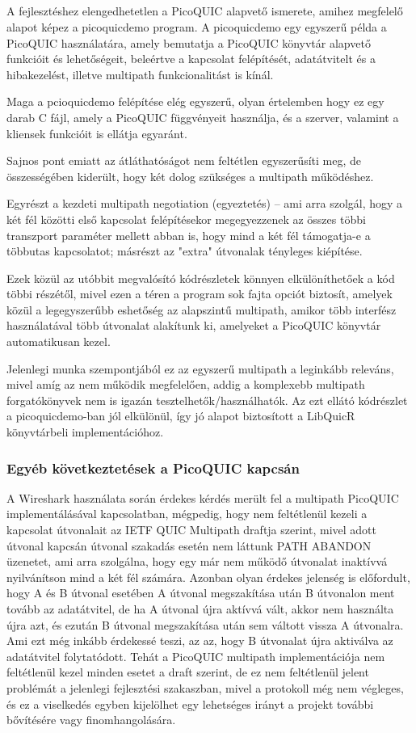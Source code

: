 \documentclass[a4paper,oneside]{article}
\begin{document}
\subparagraph{}
A fejlesztéshez elengedhetetlen a PicoQUIC alapvető ismerete, amihez megfelelő alapot képez a picoquicdemo program.
A picoquicdemo egy egyszerű példa a PicoQUIC használatára, amely bemutatja a
PicoQUIC könyvtár alapvető funkcióit és lehetőségeit, beleértve a kapcsolat
felépítését, adatátvitelt és a hibakezelést, illetve multipath funkcionalitást is kínál. 

Maga a pcioquicdemo felépítése elég egyszerű, olyan értelemben hogy ez egy darab C fájl, amely a PicoQUIC függvényeit használja, 
és a szerver, valamint a kliensek funkcióit is ellátja egyaránt. 

Sajnos pont emiatt az átláthatóságot nem feltétlen egyszerűsíti meg, de összességében kiderült, hogy két dolog szükséges a multipath működéshez.

Egyrészt a kezdeti multipath negotiation (egyeztetés) – ami arra szolgál, hogy a két fél közötti első
kapcsolat felépítésekor megegyezzenek az összes többi transzport paraméter mellett abban is, 
hogy mind a két fél támogatja-e a többutas kapcsolatot; másrészt az "extra" útvonalak tényleges kiépítése.

Ezek közül az utóbbit megvalósító kódrészletek könnyen elkülöníthetőek a kód többi részétől, mivel ezen a 
téren a program sok fajta opciót biztosít, amelyek közül a legegyszerűbb eshetőség az alapszintű 
multipath, amikor több interfész használatával több útvonalat alakítunk ki, amelyeket a PicoQUIC könyvtár automatikusan kezel.

Jelenlegi munka szempontjából ez az egyszerű multipath a leginkább releváns,
mivel amíg az nem működik megfelelően, addig a komplexebb multipath forgatókönyvek nem is igazán tesztelhetők/használhatók.
Az ezt ellátó kódrészlet a picoquicdemo-ban jól elkülönül, így jó alapot biztosított a LibQuicR könyvtárbeli implementációhoz.

\subsubsection{Egyéb következtetések a PicoQUIC kapcsán}

A Wireshark használata során érdekes kérdés merült fel a multipath PicoQUIC implementálásával kapcsolatban,
mégpedig, hogy nem feltétlenül kezeli a kapcsolat útvonalait az IETF QUIC Multipath draftja szerint, mivel adott útvonal kapcsán útvonal szakadás 
esetén nem láttunk PATH ABANDON üzenetet, ami arra szolgálna, hogy egy már nem működő útvonalat inaktívvá nyilvánítson mind a két fél számára.
Azonban olyan érdekes jelenség is előfordult, hogy A és B útvonal esetében A útvonal megszakítása után B útvonalon ment tovább az adatátvitel,
de ha A útvonal újra aktívvá vált, akkor nem használta újra azt, és ezután B útvonal megszakítása után sem váltott vissza A útvonalra. Ami ezt még inkább érdekessé 
teszi, az az, hogy B útvonalat újra aktiválva az adatátvitel folytatódott. Tehát a PicoQUIC multipath implementációja nem feltétlenül
kezel minden esetet a draft szerint, de ez nem feltétlenül jelent problémát a jelenlegi fejlesztési szakaszban, 
mivel a protokoll még nem végleges, és ez a viselkedés egyben kijelölhet egy lehetséges irányt a projekt további bővítésére vagy finomhangolására.
\end{document}
